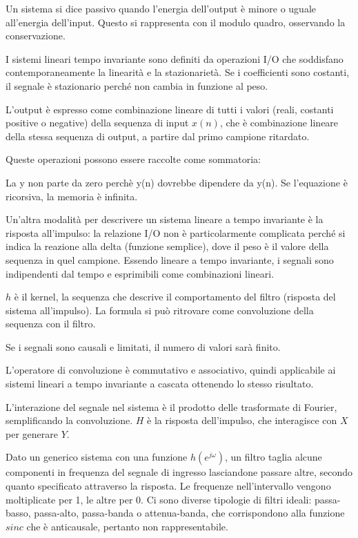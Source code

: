 Un sistema si dice passivo quando l'energia dell'output è minore o uguale all'energia dell'input. Questo si rappresenta con il modulo quadro, osservando la conservazione.

I sistemi lineari tempo invariante sono definiti da operazioni I/O che soddisfano contemporaneamente la linearità e la stazionarietà.
Se i coefficienti sono costanti, il segnale è stazionario perché non cambia in funzione al peso.

L'output è espresso come combinazione lineare di tutti i valori (reali, costanti positive o negative) della sequenza di input $x(n)$, che è combinazione lineare della stessa sequenza di output, a partire dal primo campione ritardato. 

Queste operazioni possono essere raccolte come sommatoria:

La y non parte da zero perchè y(n) dovrebbe dipendere da y(n). 
Se l'equazione è ricorsiva, la memoria è infinita.

Un'altra modalità per descrivere un sistema lineare a tempo invariante è la risposta all'impulso: la relazione I/O non è particolarmente complicata perché si indica la reazione alla delta (funzione semplice), dove il peso è il valore della sequenza in quel campione. Essendo lineare a tempo invariante, i segnali sono indipendenti dal tempo e esprimibili come combinazioni lineari. 

$h$ è il kernel, la sequenza che descrive il comportamento del filtro (risposta del sistema all'impulso). La formula si può ritrovare come convoluzione della sequenza con il filtro.

Se i segnali sono causali e limitati, il numero di valori sarà finito. 

L'operatore di convoluzione è commutativo e associativo, quindi applicabile ai sistemi lineari a tempo invariante a cascata ottenendo lo stesso risultato.

L'interazione del segnale nel sistema è il prodotto delle trasformate di Fourier, semplificando la convoluzione. $H$ è la risposta dell'impulso, che interagisce con $X$ per generare $Y$.  


Dato un generico sistema con una funzione $h(e^{j\omega})$, un filtro taglia alcune componenti in frequenza del segnale di ingresso lasciandone passare altre, secondo quanto specificato attraverso la risposta. Le frequenze nell'intervallo vengono moltiplicate per 1, le altre per 0. Ci sono diverse tipologie di filtri ideali: passa-basso, passa-alto, passa-banda o attenua-banda, che corrispondono alla funzione $sinc$ che è anticausale, pertanto non rappresentabile. 

